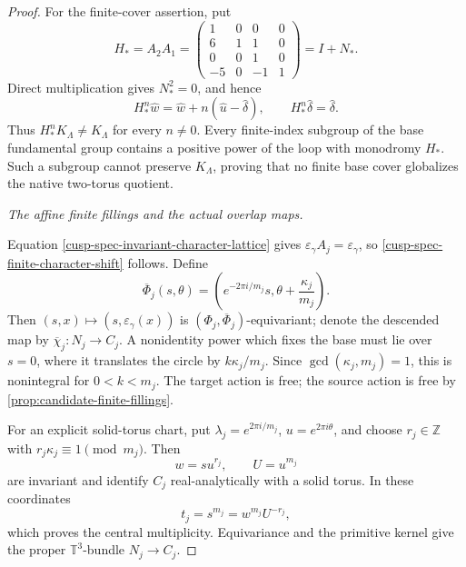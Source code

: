 \begin{proof}
For the finite-cover assertion, put
\begin{equation}
 H_*=A_2A_1
 =\begin{pmatrix}
 1&0&0&0\\
 6&1&1&0\\
 0&0&1&0\\
 -5&0&-1&1
 \end{pmatrix}=I+N_*.
 \label{cusp-spec-no-finite-cover-matrix}
\end{equation}
Direct multiplication gives \(N_*^2=0\), and hence
\begin{equation}
 H_*^n\widehat w
 =\widehat w+n(\widehat u-\widehat\delta),\qquad
 H_*^n\widehat\delta=\widehat\delta.
 \label{cusp-spec-no-finite-cover-orbit}
\end{equation}
Thus \(H_*^nK_\Lambda\ne K_\Lambda\) for every \(n\ne0\).
Every finite-index subgroup of the base fundamental group contains a
positive power of the loop with monodromy \(H_*\).  Such a subgroup cannot
preserve \(K_\Lambda\), proving that no finite base cover globalizes the
native two-torus quotient.

\medskip\noindent\emph{The affine finite fillings and the actual overlap
maps.}\par
Equation \cref{cusp-spec-invariant-character-lattice} gives
\(\varepsilon_\gamma A_j=\varepsilon_\gamma\), so
\cref{cusp-spec-finite-character-shift} follows.  Define
\[
 \overline\Phi_j(s,\theta)
 =\left(e^{-2\pi i/m_j}s,\theta+\frac{\kappa_j}{m_j}\right).
\]
Then \((s,x)\mapsto(s,\varepsilon_\gamma(x))\) is
\((\Phi_j,\overline\Phi_j)\)-equivariant; denote the descended map by
\(\overline\chi_j:N_j\to C_j\).  A nonidentity power which fixes
the base must lie over \(s=0\), where it translates the circle by
\(k\kappa_j/m_j\).  Since \(\gcd(\kappa_j,m_j)=1\), this is nonintegral
for \(0<k<m_j\).  The target action is free; the source action is free by
\cref{prop:candidate-finite-fillings}.

For an explicit solid-torus chart, put
\(\lambda_j=e^{2\pi i/m_j}\), \(u=e^{2\pi i\theta}\), and choose
\(r_j\in\mathbb Z\) with \(r_j\kappa_j\equiv1\pmod {m_j}\).  Then
\[
 w=su^{r_j},\qquad U=u^{m_j}
\]
are invariant and identify \(C_j\) real-analytically with a solid torus.
In these coordinates
\[
 t_j=s^{m_j}=w^{m_j}U^{-r_j},
\]
which proves the central multiplicity.  Equivariance and the primitive
kernel give the proper \(\mathbb T^3\)-bundle \(N_j\to C_j\).


\end{proof}
